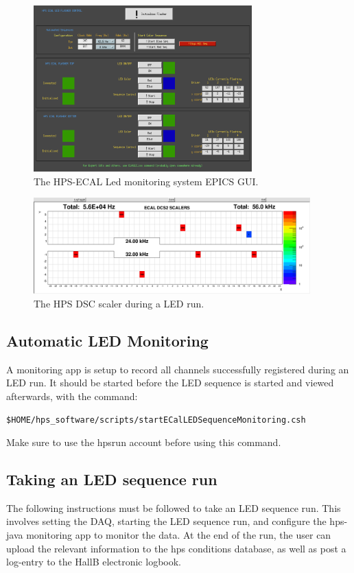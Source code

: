 \documentclass[12pt]{article}
\begin{document}
\begin{figure}[htbp]
\center
\includegraphics[width=0.75\textwidth]{pics/FlasherMEDM.png}
\caption{ \label{FlasherMEDM} The HPS-ECAL Led monitoring system EPICS GUI.}
\end{figure}
\begin{figure}[htbp]
\center
\includegraphics[width=0.95\textwidth]{pics/DSCScalersLED_2014_12_20.png}
\caption{ \label{LEDScalers} The HPS DSC scaler during a LED run.}
\end{figure}

\subsection{Automatic LED Monitoring}
A monitoring app is setup to record all channels successfully registered during an LED run.  It should be started before the LED sequence is started and viewed afterwards, with the command: \begin{center}\texttt{\$HOME/hps\_software/scripts/startECalLEDSequenceMonitoring.csh}\end{center} Make sure to use the hpsrun account before using this command.
  
\subsection{Taking an LED sequence run}
The following instructions must be followed to take an LED sequence run. This involves setting the DAQ, starting the LED sequence run, and configure the hps-java monitoring app to monitor the data. At the end of the run, the user can upload the relevant information to the hps conditions database, as well as post a log-entry to the HallB electronic logbook.
\end{document}
